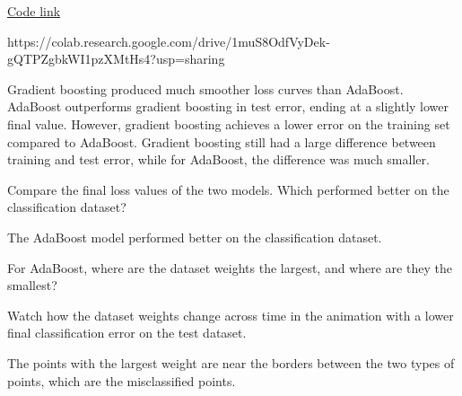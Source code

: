 \begin{solution}
    \href{https://colab.research.google.com/drive/1muS8OdfVyDek-gQTPZgbkWI1pzXMtHs4?usp=sharing}{Code link}

    https://colab.research.google.com/drive/1muS8OdfVyDek-gQTPZgbkWI1pzXMtHs4?usp=sharing

    Gradient boosting produced much smoother loss curves than AdaBoost. AdaBoost outperforms gradient boosting in test error, ending at a slightly lower final value. However, gradient boosting achieves a lower error on the training set compared to AdaBoost. Gradient boosting still had a large difference between training and test error, while for AdaBoost, the difference was much smaller.
\end{solution}

\begin{problem}[2]
    Compare the final loss values of the two models. Which performed better on the classification dataset?
\end{problem}

\begin{solution}
    The AdaBoost model performed better on the classification dataset.
\end{solution}

\newpage

\begin{problem}[2]
    For AdaBoost, where are the dataset weights the largest, and where are they the smallest?
\end{problem}
\begin{hint}
    Watch how the dataset weights change across time in the animation with a lower final classification error on the test dataset.
\end{hint}
\begin{solution}
    The points with the largest weight are near the borders between the two types of points, which are the misclassified points.
\end{solution}

